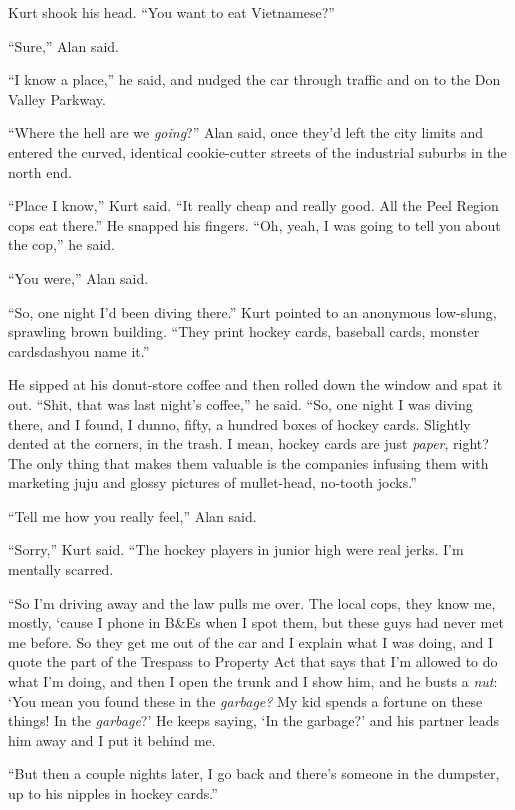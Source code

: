 Kurt shook his head.  ``You want to eat Vietnamese?''

``Sure,'' Alan said.

``I know a place,'' he said, and nudged the car through traffic and on
to the Don Valley Parkway.

``Where the hell are we \textit{going}?'' Alan said, once they'd left
the city limits and entered the curved, identical cookie-cutter
streets of the industrial suburbs in the north end.

``Place I know,'' Kurt said.  ``It really cheap and really good.  All
the Peel Region cops eat there.'' He snapped his fingers.  ``Oh, yeah,
I was going to tell you about the cop,'' he said.

``You were,'' Alan said.

``So, one night I'd been diving there.'' Kurt pointed to an anonymous
low-slung, sprawling brown building.  ``They print hockey cards,
baseball cards, monster cardsdash{}you name it.''

He sipped at his donut-store coffee and then rolled down the window
and spat it out.  ``Shit, that was last night's coffee,'' he said. 
``So, one night I was diving there, and I found, I dunno, fifty, a
hundred boxes of hockey cards.  Slightly dented at the corners, in the
trash.  I mean, hockey cards are just \textit{paper}, right?  The only
thing that makes them valuable is the companies infusing them with
marketing juju and glossy pictures of mullet-head, no-tooth jocks.''

``Tell me how you really feel,'' Alan said.

``Sorry,'' Kurt said.  ``The hockey players in junior high were real
jerks.  I'm mentally scarred.

``So I'm driving away and the law pulls me over.  The local cops, they
know me, mostly, `cause I phone in B\&Es when I spot them, but
these guys had never met me before.  So they get me out of the car and
I explain what I was doing, and I quote the part of the Trespass to
Property Act that says that I'm allowed to do what I'm doing, and then
I open the trunk and I show him, and he busts a \textit{nut}:  `You
mean you found these in the \textit{garbage?} My kid spends a fortune
on these things!  In the \textit{garbage}?' He keeps saying, `In the
garbage?' and his partner leads him away and I put it behind me.

``But then a couple nights later, I go back and there's someone in the
dumpster, up to his nipples in hockey cards.''

